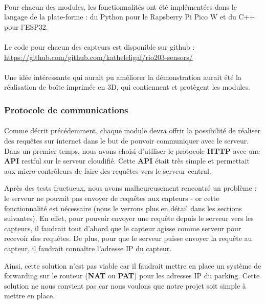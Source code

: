 \paragraph*{}
Pour chacun des modules, les fonctionnalités ont été implémentées dans le langage de la plate-forme : du Python pour le Rapsberry Pi Pico W et du C++ pour l'ESP32.

\paragraph*{}
Le code pour chacun des capteurs est disponible sur github : \url{https://github.com/github.com/katheleligaf/rio203-sensors/}

\paragraph*{}
Une idée intéressante qui aurait pu améliorer la démonstration aurait été la réalisation de boîte imprimée en 3D, qui contiennent et protègent les modules.

\clearpage

\subsubsection*{Protocole de communications}

\paragraph*{}
Comme décrit précédemment, chaque module devra offrir la possibilité de réaliser des requêtes sur internet dans le but de pouvoir communiquer avec le serveur. Dans un premier temps, nous avons choisi d'utiliser le protocole \textbf{HTTP} avec une \textbf{API} restful sur le serveur cloudifié. Cette \textbf{API} était très simple et permettait aux micro-contrôleurs de faire des requêtes vers le serveur central.

Après des tests fructueux, nous avons malheureusement rencontré un problème : le serveur ne pouvait pas envoyer de requêtes aux capteurs - or cette fonctionnalité est nécessaire (nous le verrons plus en détail dans les sections suivantes). En effet, pour pouvoir envoyer une requête depuis le serveur vers les capteurs, il faudrait tout d'abord que le capteur agisse comme serveur pour recevoir des requêtes. De plus, pour que le serveur puisse envoyer la requête au capteur, il faudrait connaître l'adresse IP du capteur. 

Ainsi, cette solution n'est pas viable car il faudrait mettre en place un système de forwarding sur le routeur (\textbf{NAT} ou \textbf{PAT}) pour les adresses IP du parking. Cette solution ne nous convient pas car nous voulons que notre projet soit simple à mettre en place.


